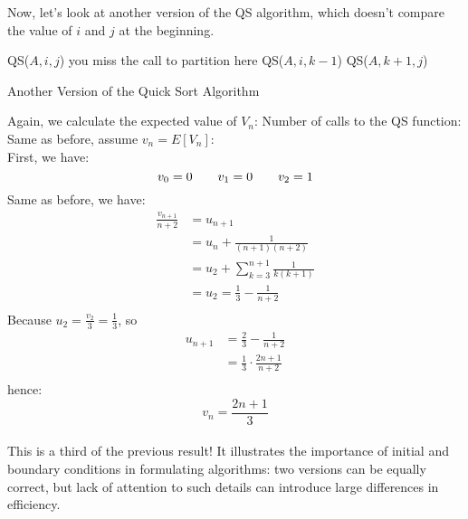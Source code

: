 \documentclass{article}
\begin{document}
Now, let's look at another version of the QS algorithm, which doesn't
compare the value of $i$ and $j$ at the beginning.\\
\begin{algorithm}[H]
QS($A,i,j$)\;
                you miss the call to partition here
 {QS($A,i,k-1$)}
 {QS($A,k+1,j$)}
\caption{Another Version of the Quick Sort Algorithm}
\end{algorithm}
Again, we calculate the expected value of $V_n$: Number of calls to
the QS function:\\
Same as before, assume $v_n=E[V_n]$:\\
First, we have:\\
\[
v_0=0\qquad v_1=0\qquad v_2=1 \\
\]
Same as before, we have: \\
\begin{align*}
\frac{v_{n+1}}{n+2}&=u_{n+1} \\
&=u_n+\frac{1}{(n+1)(n+2)} \\
&=u_2+\sum_{k=3}^{n+1}\frac{1}{k(k+1)}\\
&=u_2=\frac{1}{3}-\frac{1}{n+2}\\
\end{align*}
Because $u_2=\frac{v_2}{3}=\frac{1}{3}$, so \\
\begin{align*}
u_{n+1}&=\frac{2}{3}-\frac{1}{n+2} \\
&=\frac{1}{3}\cdot\frac{2n+1}{n+2} \\
\end{align*}
hence: \\
\[v_n=\frac{2n+1}{3}\]\\
This is a third of the previous result!  It illustrates the importance of
initial and boundary conditions in formulating algorithms: two versions
can be equally correct, but lack of attention to such details can
introduce large differences in efficiency.
\end{document}

